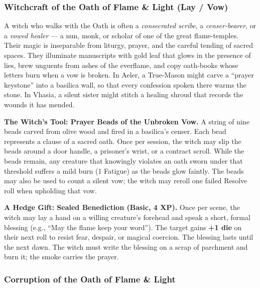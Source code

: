 \subsubsection*{Witchcraft of the Oath of Flame \& Light (Lay / Vow)}

A witch who walks with the Oath is often a \textit{consecrated scribe}, a \textit{censer-bearer}, or a \textit{vowed healer} --- a nun, monk, or scholar of one of the great flame-temples. Their magic is inseparable from liturgy, prayer, and the careful tending of sacred spaces. They illuminate manuscripts with gold leaf that glows in the presence of lies, brew unguents from ashes of the everflame, and copy oath-books whose letters burn when a vow is broken. In Aeler, a True-Mason might carve a ``prayer keystone'' into a basilica wall, so that every confession spoken there warms the stone. In Vhasia, a silent sister might stitch a healing shroud that records the wounds it has mended.

\textbf{The Witch's Tool: Prayer Beads of the Unbroken Vow.} A string of nine beads carved from olive wood and fired in a basilica's censer. Each bead represents a clause of a sacred oath. Once per session, the witch may slip the beads around a door handle, a prisoner's wrist, or a contract scroll. While the beads remain, any creature that knowingly violates an oath sworn under that threshold suffers a mild burn (1 Fatigue) as the beads glow faintly. The beads may also be used to count a silent vow; the witch may reroll one failed Resolve roll when upholding that vow.

\textbf{A Hedge Gift: Sealed Benediction (Basic, 4 XP).} Once per scene, the witch may lay a hand on a willing creature's forehead and speak a short, formal blessing (e.g., ``May the flame keep your word''). The target gains \textbf{+1 die} on their next roll to resist fear, despair, or magical coercion. The blessing lasts until the next dawn. The witch must write the blessing on a scrap of parchment and burn it; the smoke carries the prayer.

\subsubsection*{Corruption of the Oath of Flame \& Light}


